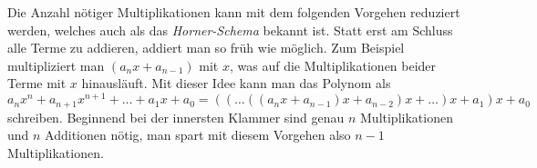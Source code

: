 Die Anzahl nötiger Multiplikationen kann mit dem folgenden Vorgehen
reduziert werden, welches auch als das {\em Horner-Schema} bekannt ist.
%
Statt erst am Schluss alle Terme zu addieren, addiert man so früh
wie möglich.
Zum Beispiel multipliziert man $(a_nx+a_{n-1})$ mit $x$, was auf
die Multiplikationen beider Terme mit $x$ hinausläuft.
Mit dieser Idee kann man das Polynom als
\[
a_nx^n
+
a_{n+1}x^{n+1}
+
\dots
+
a_1x
+
a_0
=
((\dots((a_nx+a_{n-1})x+a_{n-2})x+\dots )x+a_1)x+a_0
\]
schreiben.
Beginnend bei der innersten Klammer sind genau $n$ Multiplikationen
und $n$ Additionen nötig, man spart mit diesem Vorgehen also
$n-1$ Multiplikationen. 



